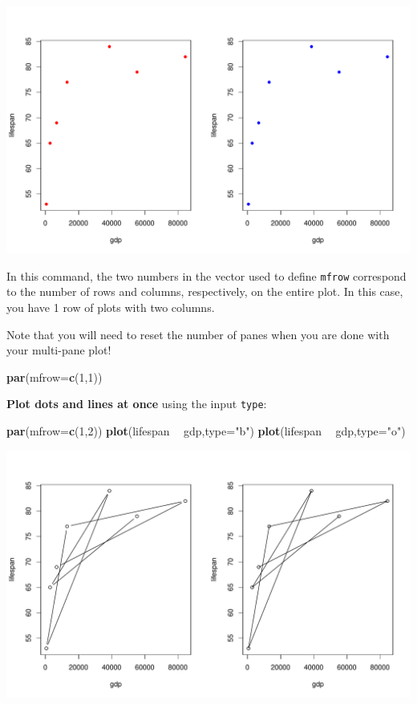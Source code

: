 \documentclass[
]{book}
\newenvironment{Shaded}{\begin{snugshade}}{\end{snugshade}}
\newcommand{\DataTypeTok}[1]{\textcolor[rgb]{0.13,0.29,0.53}{#1}}
\newcommand{\DecValTok}[1]{\textcolor[rgb]{0.00,0.00,0.81}{#1}}
\newcommand{\KeywordTok}[1]{\textcolor[rgb]{0.13,0.29,0.53}{\textbf{#1}}}
\newcommand{\NormalTok}[1]{#1}
\newcommand{\OperatorTok}[1]{\textcolor[rgb]{0.81,0.36,0.00}{\textbf{#1}}}
\newcommand{\StringTok}[1]{\textcolor[rgb]{0.31,0.60,0.02}{#1}}
\begin{document}
\includegraphics{figures/unnamed-chunk-113-1.pdf}

In this command, the two numbers in the vector used to define \texttt{mfrow} correspond to the number of rows and columns, respectively, on the entire plot. In this case, you have 1 row of plots with two columns.

Note that you will need to reset the number of panes when you are done with your multi-pane plot!

\begin{Shaded}
\begin{Highlighting}[]
\KeywordTok{par}\NormalTok{(}\DataTypeTok{mfrow=}\KeywordTok{c}\NormalTok{(}\DecValTok{1}\NormalTok{,}\DecValTok{1}\NormalTok{))}
\end{Highlighting}
\end{Shaded}

\textbf{Plot dots and lines at once} using the input \texttt{type}:

\begin{Shaded}
\begin{Highlighting}[]
\KeywordTok{par}\NormalTok{(}\DataTypeTok{mfrow=}\KeywordTok{c}\NormalTok{(}\DecValTok{1}\NormalTok{,}\DecValTok{2}\NormalTok{))}
\KeywordTok{plot}\NormalTok{(lifespan }\OperatorTok{~}\StringTok{ }\NormalTok{gdp,}\DataTypeTok{type=}\StringTok{"b"}\NormalTok{)}
\KeywordTok{plot}\NormalTok{(lifespan }\OperatorTok{~}\StringTok{ }\NormalTok{gdp,}\DataTypeTok{type=}\StringTok{"o"}\NormalTok{)}
\end{Highlighting}
\end{Shaded}

\includegraphics{figures/unnamed-chunk-115-1.pdf}
\end{document}
